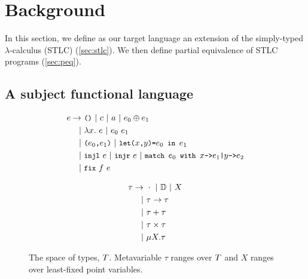 \section{Background}
\label{sec:background}
%
In this section, we define as our target language an extension of the
simply-typed $\lambda$-calculus (STLC) (\autoref{sec:stlc}).
%
We then define partial equivalence of STLC programs
(\autoref{sec:peq}).

\subsection{A subject functional language}
\label{sec:stlc}
\begin{figure}[t]
  \begin{minipage}{0.55\linewidth}
    \begin{align*}
      e \rightarrow &\ \unit\ 
                      |\ c\
                      |\ a\ 
                      |\ e_0 \oplus e_1 \\
      | &\ \lambda x.\ e \
          | \ e_0\ e_1 \\
      | &\ \pair{e_0}{e_1} \
          |\ \letexp{x}{y}{e_0}{e_1} \\
      | &\ \injl\ e\ |\ \injr\ e\ |\ \matchexp{e_0}{x}{e_1}{y}{e_2} \\
      | &\ \fix{f}{e}
    \end{align*}
    \caption{The space of program expressions, $\expr$.
      Metavariable $e$ ranges over $\expr$, %
      $c$ ranges over $\consts$, %
      $a$ ranges over $\vars$, %
      $\oplus$ ranges over base operations, %
      $x$ and $y$ range over $\absvars$, and %
      $f$ ranges over $\fixvars$. } %
    \label{fig:exprs}
  \end{minipage}
  \qquad
  \begin{minipage}{0.36\linewidth}
    \begin{align*} %
      \tau \rightarrow &\ \unitty\ |\ \basety\ |\ X \\
      | &\ \tau \rightarrow \tau \\
      | &\ \tau + \tau \\
      | &\ \tau \times \tau \\
      | &\ \mu X. \tau
    \end{align*}
    \caption{The space of types, $T$.
      Metavariable $\tau$ ranges over $T$ and $X$ ranges over
      least-fixed point variables.} %
    \label{fig:types}
  \end{minipage}
\end{figure}

